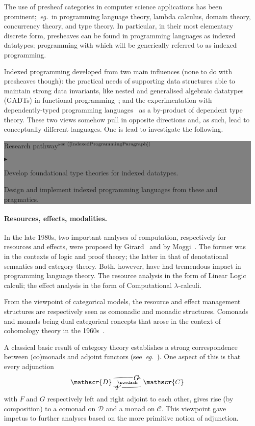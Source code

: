 \documentclass[11pt,twocolumn]{article}
\newenvironment{btritemize}
  {\begin{list}{\btr}
  {\setlength{\topsep}{2pt}
   \setlength{\partopsep}{2pt}
   \setlength{\itemsep}{2.5pt}
   \setlength{\parsep}{2.5pt}
   \setlength{\leftmargin}{1em}
   \setlength{\labelwidth}{.5em}}}
  {\end{list}}
\newcommand{\mytextsf}[1]{\textsf{\small #1}}
\newcommand{\eg}{\emph{eg.}}
\newcommand{\btr}{$\blacktriangleright$}
\newcommand{\reqpsize}{8.113395cm}%
\newcommand{\rep}[2]{\begin{center}\colorbox{grey}{\begin{minipage}{\reqpsize}
  \mytextsf{Research pathway}\hfill$^{\mbox{\scriptsize see #1 }}$\\[-5.5mm]
  \begin{btritemize}
  \item #2
  \end{btritemize}
\end{minipage}}\end{center}}
\newcommand{\cat}[1]{\mathscr{#1}}
\begin{document}
The use of presheaf categories in computer science applications has been
prominent;~\eg~in 
programming language theory, %
lambda calculus, %
domain theory, %
concurrency theory, %
and type theory. %
In particular, in their most elementary discrete form, presheaves can be
found in programming languages as indexed datatypes; programming with
which will be generically referred to as indexed programming.  

Indexed programming developed from two main influences (none to do with
presheaves though): the practical needs of supporting data structures able to
maintain strong data invariants, like nested %
and generalised algebraic %
datatypes (GADTs) in functional programming~\cite{Omega,Haskell}; and the
experimentation with dependently-typed programming
languages~\cite{Cayenne,Epigram} as a by-product of dependent type theory.
These two views somehow pull in opposite directions and, as such, lead to
conceptually different languages.  One is lead to investigate the following.
\rep{(\ref{IndexedProgrammingParagraph})} 
  {Develop foundational type theories for indexed datatypes.  
    
   Design and %
   implement indexed programming languages from these and
   pragmatics.}

\paragraph{Resources, effects, modalities.}
\label{ResourcesEffectsModalitiesParagraph}

In the late 1980s, two important analyses of computation, respectively for
resources and effects, were proposed by Girard~\cite{GirardLinearLogic} and by
Moggi~\cite{MoggiLambdaC}.  The former was in the contexts of logic and proof
theory; the latter in that of denotational semantics and category theory.
Both, however, have had tremendous impact in programming language theory.  The
resource analysis in the form of Linear Logic calculi; the effect analysis
in the form of Computational \mbox{$\lambda$-calculi}.

From the viewpoint of categorical models, the resource and effect management
structures are respectively seen as comonadic and monadic structures.
Comonads and monads being dual categorical concepts that arose in the context
of cohomology theory in the 1960s~\cite{BeckThesis}.

A classical basic result of category theory establishes a strong
correspondence between (co)monads and adjoint functors
(see~\eg~\cite{MacLane}).  One aspect of this is that every adjunction
\begin{equation}\label{ResourceEffectAdjunction}
  \xymatrix@C=40pt{
    \cat D \ar@/^.75em/[r]|(.625){\mbox{$\,G\,$}}\ar@{}[r]|-\swvdash&
    \ar@/^.75em/[l]|(.625){\mbox{$\,F\,$}} \cat C }
\end{equation}
with $F$ and $G$ respectively left and right adjoint to each other, gives
rise (by composition) to a comonad on $\cat D$ and a monad on $\cat C$.  This
viewpoint gave impetus to further analyses based on the more primitive notion
of adjunction.  
\end{document}
